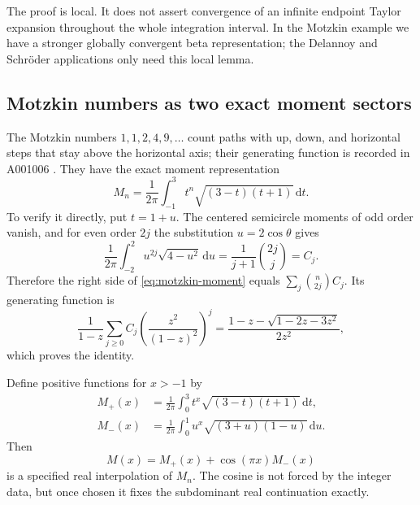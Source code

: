 \documentclass[11pt,a4paper]{article}
\numberwithin{equation}{section}
\theoremstyle{definition}
\theoremstyle{remark}
\newcommand{\dd}{\,\mathrm d}
\begin{document}
The proof is local. It does not assert convergence of an infinite endpoint Taylor expansion throughout the whole integration interval. In the Motzkin example we have a stronger globally convergent beta representation; the Delannoy and Schr\"oder applications only need this local lemma.

\subsection{Motzkin numbers as two exact moment sectors}
\label{subsec:motzkin}

The Motzkin numbers $1,1,2,4,9,\ldots$ count paths with up, down, and horizontal steps that stay above the horizontal axis; their generating function is recorded in A001006 \cite{oeismotzkin}. They have the exact moment representation
\begin{equation}
 M_n=\frac1{2\pi}\int_{-1}^3t^n\sqrt{(3-t)(t+1)}\dd t.
 \label{eq:motzkin-moment}
\end{equation}
To verify it directly, put $t=1+u$. The centered semicircle moments of odd order vanish, and for even order $2j$ the substitution $u=2\cos\theta$ gives
\[
 \frac1{2\pi}\int_{-2}^2u^{2j}\sqrt{4-u^2}\dd u
 =\frac1{j+1}\binom{2j}{j}=C_j.
\]
Therefore the right side of \eqref{eq:motzkin-moment} equals
$\sum_j\binom n{2j}C_j$. Its generating function is
\[
 \frac1{1-z}\sum_{j\ge0}C_j\left(\frac{z^2}{(1-z)^2}\right)^j
 =\frac{1-z-\sqrt{1-2z-3z^2}}{2z^2},
\]
which proves the identity.

Define positive functions for $x>-1$ by
\begin{align}
 M_+(x)&=\frac1{2\pi}\int_0^3t^x\sqrt{(3-t)(t+1)}\dd t,\nonumber\\
 M_-(x)&=\frac1{2\pi}\int_0^1u^x\sqrt{(3+u)(1-u)}\dd u.
 \label{eq:motzkin-sectors}
\end{align}
Then
\begin{equation}
 M(x)=M_+(x)+\cos(\pi x)M_-(x)
 \label{eq:motzkin-cont}
\end{equation}
is a specified real interpolation of $M_n$. The cosine is not forced by the integer data, but once chosen it fixes the subdominant real continuation exactly.
\end{document}
